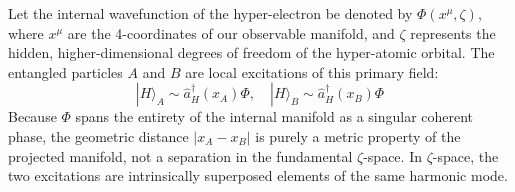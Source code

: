 Let the internal wavefunction of the hyper-electron be denoted by $\Phi(x^\mu, \zeta)$, where $x^\mu$ are the 4-coordinates of our observable manifold, and $\zeta$ represents the hidden, higher-dimensional degrees of freedom of the hyper-atomic orbital. The entangled particles $A$ and $B$ are local excitations of this primary field:
\begin{equation}
|H\rangle_A \sim \hat{a}^\dagger_H(x_A) \Phi, \quad |H\rangle_B \sim \hat{a}^\dagger_H(x_B) \Phi
\end{equation}
Because $\Phi$ spans the entirety of the internal manifold as a singular coherent phase, the geometric distance $|x_A - x_B|$ is purely a metric property of the projected manifold, not a separation in the fundamental $\zeta$-space. In $\zeta$-space, the two excitations are intrinsically superposed elements of the same harmonic mode. 

